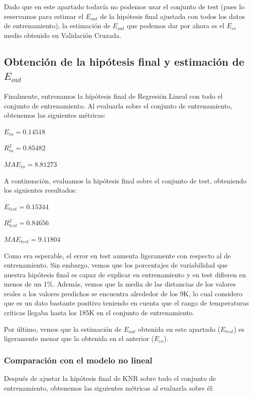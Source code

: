 \documentclass[10pt,a4paper]{article}
\begin{document}
Dado que en este apartado todavía no podemos usar el conjunto de test (pues lo reservamos para estimar el $E_{out}$ de la hipótesis final ajustada con todos los datos de entrenamiento), la estimación de $E_{out}$ que podemos dar por ahora es el $E_{cv}$ medio obtenido en Validación Cruzada.



\subsection{Obtención de la hipótesis final y estimación de $E_{out}$}

Finalmente, entrenamos la hipótesis final de Regresión Lineal con todo el conjunto de entrenamiento. Al evaluarla sobre el conjunto de entrenamiento, obtenemos las siguientes métricas:

$E_{in} = 0.14518$

$R^2_{in} = 0.85482$

$MAE_{in} = 8.81273$

A continuación, evaluamos la hipótesis final sobre el conjunto de test, obteniendo los siguientes resultados:

$E_{test} = 0.15344$

$R^2_{test} = 0.84656$

$MAE_{test} = 9.11804$

Como era esperable, el error en test aumenta ligeramente con respecto al de entrenamiento. Sin embargo, vemos que los porcentajes de variabilidad que nuestra hipótesis final es capaz de explicar en entrenamiento y en test difieren en menos de un 1\%. Además, vemos que la media de las distancias de los valores reales a los valores predichos se encuentra alrededor de los 9K, lo cual considero que es un dato bastante positivo teniendo en cuenta que el rango de temperaturas críticas llegaba hasta los 185K en el conjunto de entrenamiento.

Por último, vemos que la estimación de $E_{out}$ obtenida en este apartado ($E_{test}$) es ligeramente menor que la obtenida en el anterior ($E_{cv}$).

\subsubsection{Comparación con el modelo no lineal}

Después de ajustar la hipótesis final de KNR sobre todo el conjunto de entrenamiento, obtenemos las siguientes métricas al evaluarla sobre él:
\end{document}

